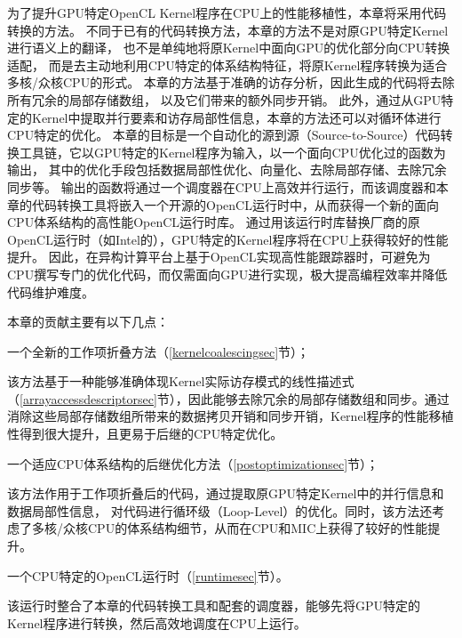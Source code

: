 为了提升GPU特定OpenCL Kernel程序在CPU上的性能移植性，本章将采用代码转换的方法。
不同于已有的代码转换方法，本章的方法不是对原GPU特定Kernel进行语义上的翻译，
也不是单纯地将原Kernel中面向GPU的优化部分向CPU转换适配，
而是去主动地利用CPU特定的体系结构特征，将原Kernel程序转换为适合多核/众核CPU的形式。
本章的方法基于准确的访存分析，因此生成的代码将去除所有冗余的局部存储数组，
以及它们带来的额外同步开销。
此外，通过从GPU特定的Kernel中提取并行要素和访存局部性信息，本章的方法还可以对循环体进行CPU特定的优化。
本章的目标是一个自动化的源到源（Source-to-Source）代码转换工具链，它以GPU特定的Kernel程序为输入，以一个面向CPU优化过的函数为输出，
其中的优化手段包括数据局部性优化、向量化、去除局部存储、去除冗余同步等。
输出的函数将通过一个调度器在CPU上高效并行运行，而该调度器和本章的代码转换工具将嵌入一个开源的OpenCL运行时中，从而获得一个新的面向CPU体系结构的高性能OpenCL运行时库。
通过用该运行时库替换厂商的原OpenCL运行时（如Intel的\cite{intelocl}），GPU特定的Kernel程序将在CPU上获得较好的性能提升。
因此，在异构计算平台上基于OpenCL实现高性能跟踪器时，可避免为CPU撰写专门的优化代码，而仅需面向GPU进行实现，极大提高编程效率并降低代码维护难度。

本章的贡献主要有以下几点：
\begin{compactitem}
\item 一个全新的工作项折叠方法（\ref{kernelcoalescingsec}节）；
\end{compactitem}

该方法基于一种能够准确体现Kernel实际访存模式的线性描述式（\ref{arrayaccessdescriptorsec}节），因此能够去除冗余的局部存储数组和同步。通过消除这些局部存储数组所带来的数据拷贝开销和同步开销，Kernel程序的性能移植性得到很大提升，且更易于后继的CPU特定优化。

\begin{compactitem}
\item 一个适应CPU体系结构的后继优化方法（\ref{postoptimizationsec}节）；
\end{compactitem}

该方法作用于工作项折叠后的代码，通过提取原GPU特定Kernel中的并行信息和数据局部性信息，
对代码进行循环级（Loop-Level）的优化。同时，该方法还考虑了多核/众核CPU的体系结构细节，从而在CPU和MIC上获得了较好的性能提升。

\begin{compactitem}
\item 一个CPU特定的OpenCL运行时（\ref{runtimesec}节）。
\end{compactitem}

该运行时整合了本章的代码转换工具和配套的调度器，能够先将GPU特定的Kernel程序进行转换，然后高效地调度在CPU上运行。

